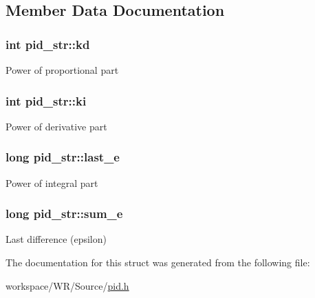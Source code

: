 \subsection{Member Data Documentation}
\hypertarget{structpid__str_a0f9566f4e143fbbf1a8c4f3ab920f7cb}{
\subsubsection[{kd}]{\setlength{\rightskip}{0pt plus 5cm}int {\bf pid\_\-str::kd}}}
\label{structpid__str_a0f9566f4e143fbbf1a8c4f3ab920f7cb}
Power of proportional part \hypertarget{structpid__str_a1246caf4496665d0d9122ae001e9bbea}{
\subsubsection[{ki}]{\setlength{\rightskip}{0pt plus 5cm}int {\bf pid\_\-str::ki}}}
\label{structpid__str_a1246caf4496665d0d9122ae001e9bbea}
Power of derivative part \hypertarget{structpid__str_afba88804d3ae4faf2c06e0199d553745}{
\subsubsection[{last\_\-e}]{\setlength{\rightskip}{0pt plus 5cm}long {\bf pid\_\-str::last\_\-e}}}
\label{structpid__str_afba88804d3ae4faf2c06e0199d553745}
Power of integral part \hypertarget{structpid__str_ab5da6edeb8d607bf45f9be8330079120}{
\subsubsection[{sum\_\-e}]{\setlength{\rightskip}{0pt plus 5cm}long {\bf pid\_\-str::sum\_\-e}}}
\label{structpid__str_ab5da6edeb8d607bf45f9be8330079120}
Last difference (epsilon) 

The documentation for this struct was generated from the following file:\begin{DoxyCompactItemize}
\item 
workspace/WR/Source/\hyperlink{pid_8h}{pid.h}\end{DoxyCompactItemize}
